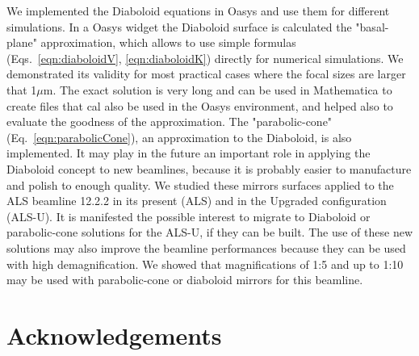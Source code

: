 \documentclass{iucr}              %
\begin{document}
We implemented the Diaboloid equations in Oasys and use them for different simulations. In a Oasys widget the Diaboloid surface is calculated the "basal-plane" approximation, which allows to use simple formulas (Eqs.~\ref{eqn:diaboloidV}, \ref{eqn:diaboloidK}) directly for numerical simulations. We demonstrated its validity for most practical cases where the focal sizes are larger that 1$\mu$m. 
The exact solution \cite{lacey} is very long and can be used in Mathematica to create files that cal also be used in the Oasys environment, and helped also to evaluate the goodness of the approximation. 
The "parabolic-cone" (Eq.~\ref{eqn:parabolicCone}), an  approximation to the Diaboloid, is also implemented. It may play in the future an important role in applying the Diaboloid concept to new beamlines, because it is probably easier to manufacture and polish to enough quality. We studied these mirrors surfaces applied to the ALS beamline 12.2.2 in its present (ALS) and in the Upgraded configuration (ALS-U). It is manifested the possible interest to migrate to Diaboloid or parabolic-cone solutions for the ALS-U, if they can be built. The use of these new solutions may also improve the beamline performances because they can be used with high demagnification. We showed that magnifications of 1:5 and up to 1:10 may be used with parabolic-cone or diaboloid mirrors for this beamline. 






\section{Acknowledgements}       
 
\end{document}
